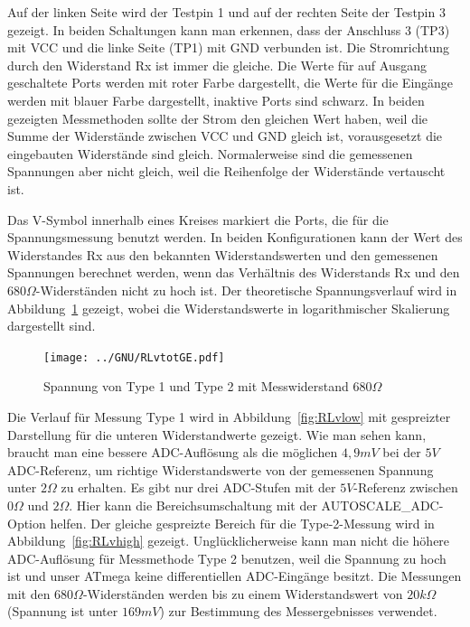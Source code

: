 Auf der linken Seite wird der Testpin 1 und auf der rechten Seite der Testpin 3 gezeigt.
In beiden Schaltungen kann man erkennen, dass der Anschluss 3 (TP3) mit VCC und die linke Seite (TP1) mit
GND verbunden ist.
Die Stromrichtung durch den Widerstand Rx ist immer die gleiche.
Die Werte für auf Ausgang geschaltete Ports werden mit roter Farbe dargestellt, 
die Werte für die Eingänge werden mit blauer Farbe dargestellt, inaktive Ports sind schwarz.
In beiden gezeigten Messmethoden sollte der Strom den gleichen Wert haben, weil die Summe der Widerstände zwischen
VCC und GND gleich ist, vorausgesetzt die eingebauten Widerstände sind gleich.
Normalerweise sind die gemessenen Spannungen aber nicht gleich, weil die Reihenfolge
der Widerstände vertauscht ist.

Das V-Symbol innerhalb eines Kreises markiert die Ports, die für die Spannungsmessung benutzt werden.
In beiden Konfigurationen kann der Wert des Widerstandes Rx aus den bekannten Widerstandswerten
und den gemessenen Spannungen berechnet werden, wenn das Verhältnis des Widerstands Rx und den \(680\Omega\)-Widerständen
 nicht zu hoch ist.
Der theoretische Spannungsverlauf wird in Abbildung~\ref{fig:RLvtot} gezeigt, wobei die Widerstandswerte 
in logarithmischer Skalierung dargestellt sind.
\begin{figure}[H]
\centering
\texttt{[image: ../GNU/RLvtotGE.pdf]}
\caption{Spannung von Type 1 und Type 2 mit Messwiderstand \(680\Omega\) }
\label{fig:RLvtot}
\end{figure}
Die Verlauf für Messung Type 1 wird in Abbildung~\ref{fig:RLvlow} mit gespreizter Darstellung für die unteren Widerstandwerte gezeigt.
Wie man sehen kann, braucht man eine bessere ADC-Auflösung als die möglichen \(4,9mV\) bei der \(5V\) ADC-Referenz, um richtige
Widerstandswerte von der gemessenen Spannung unter \(2\Omega\) zu erhalten.
Es gibt nur drei ADC-Stufen mit der \(5V\)-Referenz zwischen \(0\Omega\) und \(2\Omega\).
Hier kann die Bereichsumschaltung mit der AUTOSCALE\_ADC-Option helfen.
Der gleiche gespreizte Bereich für die Type-2-Messung wird in Abbildung~\ref{fig:RLvhigh} gezeigt.
Unglücklicherweise kann man nicht die höhere ADC-Auflösung für Messmethode Type 2 benutzen,
weil die Spannung zu hoch ist und unser ATmega keine differentiellen ADC-Eingänge besitzt.
Die Messungen mit den \(680\Omega\)-Widerständen werden bis zu einem Widerstandswert von 
\(20k\Omega\) (Spannung ist unter \(169mV\)) zur Bestimmung des Messergebnisses verwendet.

